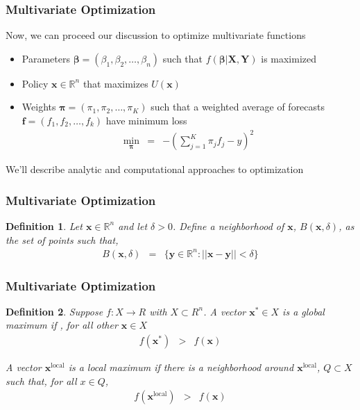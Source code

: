 \documentclass{beamer}
\newtheorem{defn}{Definition}
\numberwithin{equation}{section}
\begin{document}
\begin{frame}
\frametitle{Multivariate Optimization}

Now, we can proceed our discussion to optimize multivariate functions \pause
\begin{itemize}
\item[-] Parameters $\boldsymbol{\beta} = (\beta_{1}, \beta_{2}, \hdots, \beta_{n} ) $ such that $f(\boldsymbol{\beta}| \boldsymbol{X}, \boldsymbol{Y})$ is maximized
\item[-] Policy $\boldsymbol{x} \in \mathbb{R}^{n}$ that maximizes $U(\boldsymbol{x})$
\item[-] Weights $\boldsymbol{\pi} = (\pi_{1}, \pi_{2}, \hdots, \pi_{K})$ such that a weighted average of forecasts $\boldsymbol{f}  =  (f_{1} , f_{2}, \hdots, f_{k})$ have minimum loss 
\begin{eqnarray}
\min_{\boldsymbol{\pi}} & = & - (\sum_{j=1}^{K} \pi_{j} f_{j}  - y ) ^ 2 \nonumber 
\end{eqnarray} 
\end{itemize} \pause

We'll describe analytic and computational approaches to optimization

\end{frame}




\begin{frame}
\frametitle{Multivariate Optimization}

\begin{defn} 
Let $\boldsymbol{x} \in \mathbb{R}^{n}$ and let $\delta >0$.  Define a \alert{neighborhood} of $\boldsymbol{x}$, $B(\boldsymbol{x}, \delta)$, as the set of points such that, 
\begin{eqnarray}
B(\boldsymbol{x}, \delta) & = & \{ \boldsymbol{y} \in \mathbb{R}^{n} : ||\boldsymbol{x} - \boldsymbol{y}||< \delta \}  \nonumber 
\end{eqnarray}
\end{defn}

\end{frame}



\begin{frame}
\frametitle{Multivariate Optimization}


\begin{defn} Suppose $f:X \rightarrow R$ with $X \subset R^{n}$.  A vector $\boldsymbol{x}^{*} \in X$ is a \alert{global maximum} if , for all other $\boldsymbol{x} \in X$ 
\begin{eqnarray}
f(\boldsymbol{x}^{*}) & > & f(\boldsymbol{x} ) \nonumber 
\end{eqnarray}

A vector $\boldsymbol{x}^{\text{local}}$ is a \alert{local} maximum if there is a neighborhood around $\boldsymbol{x}^{\text{local}}$, $Q \subset X$ such that, for all $x \in Q$, 
\begin{eqnarray}
f(\boldsymbol{x}^{\text{local} }) & > & f(\boldsymbol{x} ) \nonumber 
\end{eqnarray}
\end{defn}

\end{frame}
\end{document}
